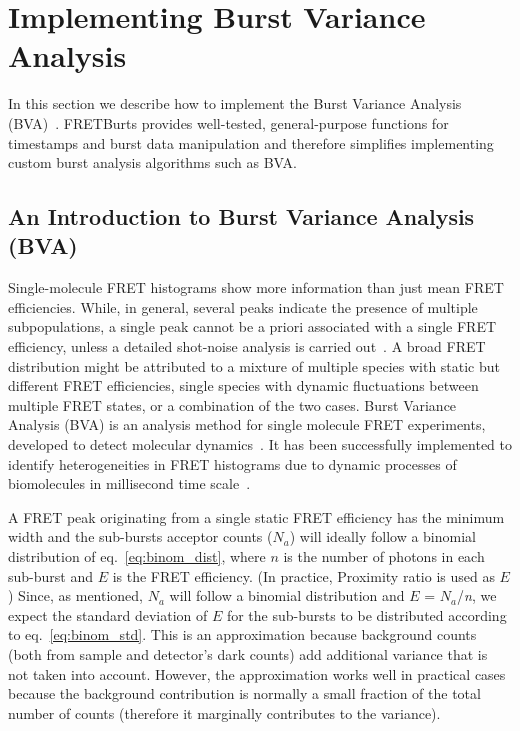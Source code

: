 \section{Implementing Burst Variance Analysis}
\label{sec:bva}
In this section we describe how to implement the Burst Variance Analysis (BVA)~\cite{Torella_2011}.
FRETBurts provides well-tested, general-purpose functions for timestamps and burst data 
manipulation and therefore simplifies implementing custom burst analysis algorithms such as BVA.

\subsection{An Introduction to Burst Variance Analysis (BVA)}
Single-molecule FRET histograms show more information than just mean FRET efficiencies. 
While, in general, several peaks indicate the presence of multiple subpopulations, 
a single peak cannot be a priori associated with a single FRET efficiency,
unless a detailed shot-noise analysis is carried out~\cite{Nir_2006,Antonik2006}.
A broad FRET distribution might be attributed to a mixture of multiple species with static but different FRET efficiencies, single species with dynamic fluctuations between multiple FRET states, or a combination of the two cases. Burst Variance Analysis (BVA) is an analysis method for single molecule FRET experiments, developed to detect molecular dynamics~\cite{Torella_2011}. It has been successfully implemented to identify heterogeneities in FRET histograms due to dynamic processes of biomolecules in millisecond time scale~\cite{Torella_2011, Robb_2013}.

A FRET peak originating from a single static FRET efficiency has the minimum width and 
the sub-bursts acceptor counts ($N_a$) will ideally follow a binomial distribution of 
eq.~\ref{eq:binom_dist}, where $n$ is the number of photons in each sub-burst and 
$E$ is the FRET efficiency. (In practice, Proximity ratio is used as $E$) Since, as mentioned, $N_a$ will follow a binomial distribution and $E$ = {$N_a$}/\textit{n}, we expect the standard deviation of $E$ for the sub-bursts to be distributed according to eq.~\ref{eq:binom_std}. This is an approximation because background counts (both from sample and detector's dark counts) add additional variance that is not taken into account.
However, the approximation works well in practical cases because the background contribution
is normally a small fraction of the total number of counts (therefore it marginally contributes to the variance).

